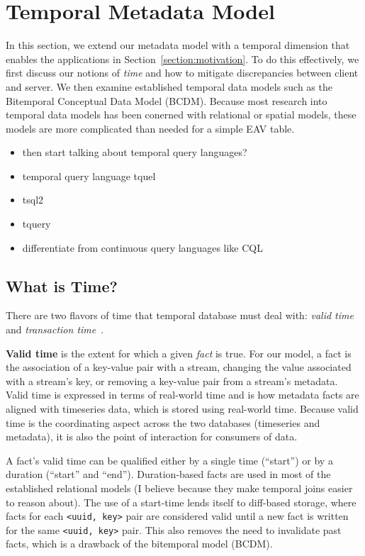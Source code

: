 \section{Temporal Metadata Model} \label{section:temporal}

In this section, we extend our metadata model with a temporal dimension that
enables the applications in Section~\ref{section:motivation}. To do this effectively, we first
discuss our notions of \emph{time} and how to mitigate discrepancies between client and server.
We then examine established temporal data models such as the Bitemporal Conceptual Data Model (BCDM).
Because most research into temporal data models has been conerned with relational or spatial models,
these models are more complicated than needed for a simple EAV table.

\begin{itemize}
\item then start talking about temporal query languages?
\item temporal query language tquel~\cite{snodgrass1987temporal}
\item tsql2~\cite{snodgrass2012tsql2}
\item tquery~\cite{kahn1991tquery}
\item differentiate from continuous query languages like CQL~\cite{arasu2006cql}
\end{itemize}

\subsection{What is Time?}

There are two flavors of time that temporal database must deal with:
\emph{valid time} and \emph{transaction time}~\cite{jensen1999temporal}\cite{jensen1996semantics}.

\textbf{Valid time} is the extent for which a given \emph{fact} is true. For
our model, a fact is the association of a key-value pair with a stream,
changing the value associated with a stream's key, or removing a key-value pair
from a stream's metadata. Valid time is expressed in terms of real-world time
and is how metadata facts are aligned with timeseries data, which is stored
using real-world time. Because valid time is the coordinating aspect across the
two databases (timeseries and metadata), it is also the point of interaction
for consumers of data.

A fact's valid time can be qualified either by a single time (``start'') or by
a duration (``start'' and ``end''). Duration-based facts are used in most of
the established relational models (I believe because they make temporal joins
easier to reason about).  The use of a start-time lends itself to diff-based
storage, where facts for each \texttt{<uuid, key>} pair are considered valid
until a new fact is written for the same \texttt{<uuid, key>} pair. This also
removes the need to invalidate past facts, which is a drawback of the
bitemporal model (BCDM).

